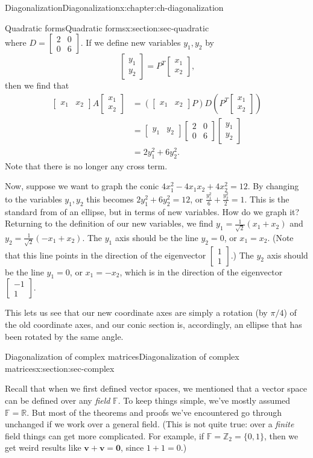 \documentclass[oneside,10pt,]{book}
\numberwithin{equation}{section}
\newcommand{\bbm}{\begin{bmatrix}}
\newcommand{\ebm}{\end{bmatrix}}
\newcommand{\vv}{\mathbf{v}}
\newcommand{\amp}{&}
\begin{document}
\begin{chapterptx}{Diagonalization}{}{Diagonalization}{}{}{x:chapter:ch-diagonalization}
\begin{sectionptx}{Quadratic forms}{}{Quadratic forms}{}{}{x:section:sec-quadratic}
\begin{equation*}
\end{equation*}
where \(D = \bbm 2\amp 0\\0\amp 6\ebm\). If we define new variables \(y_1,y_2\) by%
\begin{equation*}
\bbm y_1\\y_2\ebm = P^T\bbm x_1\\x_2\ebm\text{,}
\end{equation*}
then we find that%
\begin{align*}
\bbm x_1\amp x_2\ebm A\bbm x_1\\x_2\ebm \amp = (\bbm x_1\amp x_2\ebm P)D\left(P^T\bbm x_1\\x_2\ebm\right) \\
\amp = \bbm y_1 \amp y_2\ebm\bbm 2\amp 0\\0\amp 6\ebm\bbm y_1\\y_2\ebm\\
\amp = 2y_1^2+6y_2^2\text{.}
\end{align*}
Note that there is no longer any cross term.%
\par
Now, suppose we want to graph the conic \(4x_1^2-4x_1x_2+4x_2^2=12\). By changing to the variables \(y_1,y_2\) this becomes \(2y_1^2+6y_2^2=12\), or \(\frac{y_1^2}{6}+\frac{y_2^2}{2}=1\). This is the standard from of an ellipse, but in terms of new variables. How do we graph it? Returning to the definition of our new variables, we find \(y_1=\frac{1}{\sqrt{2}}(x_1+x_2)\) and \(y_2=\frac{1}{\sqrt{2}}(-x_1+x_2)\). The \(y_1\) axis should be the line \(y_2=0\), or \(x_1=x_2\). (Note that this line points in the direction of the eigenvector \(\bbm 1\\1\ebm\).) The \(y_2\) axis should be the line \(y_1=0\), or \(x_1=-x_2\), which is in the direction of the eigenvector \(\bbm -1\\1\ebm\).%
\par
This lets us see that our new coordinate axes are simply a rotation (by \(\pi/4\)) of the old coordinate axes, and our conic section is, accordingly, an ellipse that has been rotated by the same angle.%
\end{sectionptx}
%
%
\typeout{************************************************}
\typeout{************************************************}
%
\begin{sectionptx}{Diagonalization of complex matrices}{}{Diagonalization of complex matrices}{}{}{x:section:sec-complex}
\begin{introduction}{}%
Recall that when we first defined vector spaces, we mentioned that a vector space can be defined over any \emph{field} \(\mathbb{F}\). To keep things simple, we've mostly assumed \(\mathbb{F}=\mathbb{R}\). But most of the theorems and proofs we've encountered go through unchanged if we work over a general field. (This is not quite true: over a \emph{finite} field things can get more complicated. For example, if \(\mathbb{F}=\mathbb{Z}_2=\{0,1\}\), then we get weird results like \(\vv+\vv=\mathbf{0}\), since \(1+1=0\).)%

\end{introduction}
\end{sectionptx}
\end{chapterptx}
\end{document}
